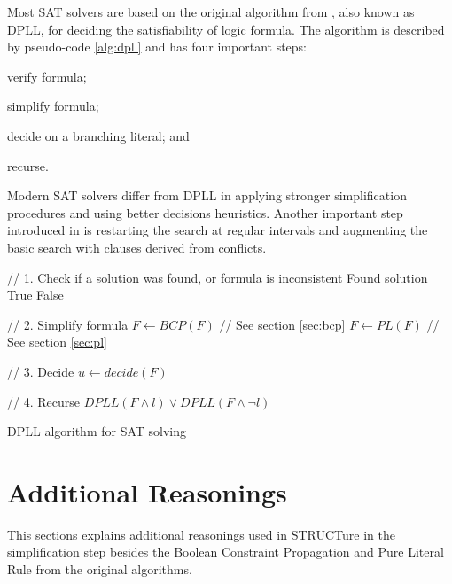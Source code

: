 Most SAT solvers are based on the original algorithm from
\cite{Davis:1962:MPT:368273.368557}, also known as DPLL, for deciding
the satisfiability of logic formula.  The algorithm is described
by pseudo-code \ref{alg:dpll} and has four important steps:
\begin{inparaenum}[1)]
  \item verify formula;
  \item simplify formula;
  \item decide on a branching literal; and
  \item recurse.
\end{inparaenum}

Modern SAT solvers differ from DPLL in applying
stronger simplification procedures and using better
decisions heuristics. Another important step introduced in
\cite{Marques-silva99grasp:a} is restarting the search at regular
intervals and augmenting the basic search with clauses derived
from conflicts.


\begin{algorithm}
  \begin{algorithmic}

    // 1. Check if a solution was found, or formula is inconsistent
      \PRINT Found solution
      \RETURN True
    \ENDIF
      \RETURN False
    \ENDIF

    // 2. Simplify formula
    \STATE $F \gets BCP(F)$ // See section \ref{sec:bcp}
    \STATE $F \gets PL(F)$  // See section \ref{sec:pl}

    // 3. Decide
    \STATE $u \gets decide(F)$

    // 4. Recurse
    \RETURN $DPLL(F \land l) \lor DPLL(F \land \neg l)$
  \end{algorithmic}

  \caption{DPLL algorithm for SAT solving}
  \label{alg:dpll}
\end{algorithm}


\section{Additional Reasonings}

This sections explains additional reasonings used in STRUCTure in
the simplification step besides the Boolean Constraint Propagation
and Pure Literal Rule from the original algorithms.


